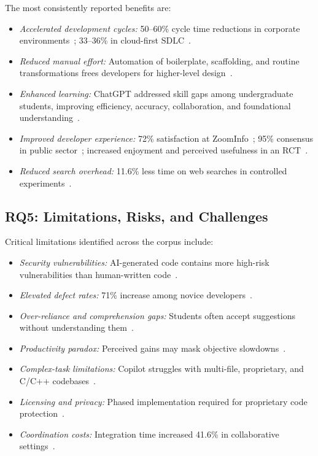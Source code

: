 \documentclass[journal,twoside,10pt]{IEEEtran}
\begin{document}
The most consistently reported benefits are:
\begin{itemize}
  \item \textit{Accelerated development cycles:} 50--60\% cycle time reductions
        in corporate environments~\cite{agarwal2025corporate}; 33--36\% in
        cloud-first SDLC~\cite{pandey2024copilot}.
  \item \textit{Reduced manual effort:} Automation of boilerplate, scaffolding,
        and routine transformations frees developers for higher-level
        design~\cite{anon2025agile,swaraj2025llm}.
  \item \textit{Enhanced learning:} ChatGPT addressed skill gaps among
        undergraduate students, improving efficiency, accuracy, collaboration,
        and foundational understanding~\cite{waseem2023novice}.
  \item \textit{Improved developer experience:} 72\% satisfaction at
        ZoomInfo~\cite{bakal2025zoominfo}; 95\% consensus in public
        sector~\cite{ng2024publicsector}; increased enjoyment and perceived
        usefulness in an RCT~\cite{butler2024rct}.
  \item \textit{Reduced search overhead:} 11.6\% less time on web searches
        in controlled experiments~\cite{shihab2025brownfield}.
\end{itemize}

\subsection{RQ5: Limitations, Risks, and Challenges}

Critical limitations identified across the corpus include:
\begin{itemize}
  \item \textit{Security vulnerabilities:} AI-generated code contains more
        high-risk vulnerabilities than human-written
        code~\cite{cotroneo2025defects,swaraj2025llm}.
  \item \textit{Elevated defect rates:} 71\% increase among novice
        developers~\cite{urs2025trust}.
  \item \textit{Over-reliance and comprehension gaps:} Students often accept
        suggestions without understanding
        them~\cite{shihab2025brownfield,olivares2025meta}.
  \item \textit{Productivity paradox:} Perceived gains may mask objective
        slowdowns~\cite{swaraj2025llm,mohamed2025slr}.
  \item \textit{Complex-task limitations:} Copilot struggles with multi-file,
        proprietary, and C/C++ codebases~\cite{pandey2024copilot}.
  \item \textit{Licensing and privacy:} Phased implementation required for
        proprietary code protection~\cite{agarwal2025corporate}.
  \item \textit{Coordination costs:} Integration time increased 41.6\% in
        collaborative settings~\cite{song2024opensource}.
\end{itemize}
\end{document}
